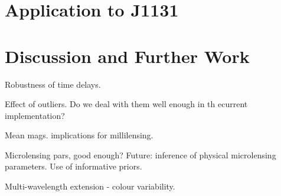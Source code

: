 \documentclass[useAMS,usenatbib, a4paper]{mn2e} \usepackage{natbib}
\begin{document}




\section{Application to J1131}

\citep{2006astro.ph..5321M}



\section{Discussion and Further Work}

Robustness of time delays.

Effect of outliers. Do we deal with them well enough in th ecurrent implementation?

Mean mags. implications for millilensing.

Microlensing pars, good enough? Future: inference of physical microlensing parameters. 
Use of informative priors.

Multi-wavelength extension - colour variability.
\end{document}
